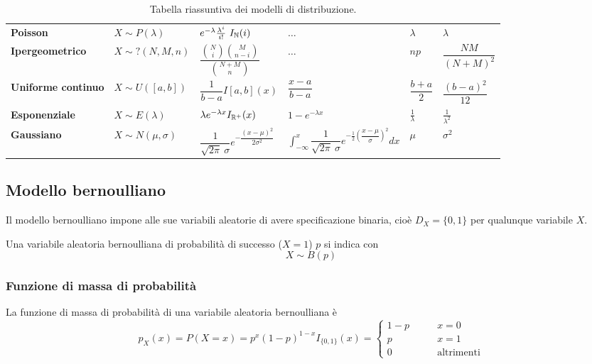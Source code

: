 \begin{sidewaystable}
\begin{tabular}{llllll}
		\bfseries Poisson           & $X\sim P(\lambda)$    & $e^{-\lambda}\frac{\lambda^i}{i!} ~ I_\mathbb N(i)$                     & $\dots$                                                                                                               & $\lambda$           & $\lambda$             \\[2ex]
		\bfseries Ipergeometrico    & $X\sim ?(N,M,n)$      & $\dfrac{\binom{N}{i}\binom{M}{n-i}}{\binom{N+M}{n}}$             & $\dots$                                                                                                               & $np$                & $\dfrac{NM}{(N+M)^2}$ \\[2ex]
		\bfseries Uniforme continuo & $X\sim U([a,b])$      & $\dfrac{1}{b-a} I[a,b](x)$                                       & $ \dfrac{x-a}{b-a}$                                                                                                   & $\dfrac{b+a}{2}$    & $\dfrac{(b-a)^2}{12}$ \\[3ex]
		\bfseries Esponenziale      & $X\sim E(\lambda)$    & $\lambda e^{-\lambda x} I_{\mathbb R^+}(x)$                             & $1-e^{-\lambda x}$                                                                                                    & $\frac{1}{\lambda}$ & $\frac{1}{\lambda^2}$ \\[1ex]
		\bfseries Gaussiano         & $X\sim N(\mu,\sigma)$ & $\dfrac{1}{\sqrt{2\pi}~\sigma}e^{-\dfrac{(x-\mu)^2}{2\sigma^2}}$ & $\displaystyle\int_{-\infty}^x \dfrac{1}{\sqrt{2\pi}~\sigma} e^{-\frac{1}{2}\left(\dfrac{x-\mu}{\sigma}\right)^2} dx$ & $\mu$               & $\sigma^2$            \\
		\bottomrule
	\end{tabular}
	\caption{Tabella riassuntiva dei modelli di distribuzione.}
\end{sidewaystable}

\subsection{Modello bernoulliano}
Il modello bernoulliano impone alle sue variabili aleatorie di avere specificazione binaria, cioè $D_X=\{0,1\}$ per qualunque variabile $X$.

Una variabile aleatoria bernoulliana di probabilità di successo ($X=1$) $p$ si indica con
\begin{equation*}
	X\sim B(p)
\end{equation*}


\subsubsection{Funzione di massa di probabilità}
La funzione di massa di probabilità di una variabile aleatoria bernoulliana è
\begin{equation*}
	p_X(x)=P(X=x)=p^x(1-p)^{1-x}I_{\{0,1\}}(x)=\begin{cases}
		1-p \qquad & x=0               \\
		p \qquad   & x=1               \\
		0 \qquad   & \text{altrimenti}
	\end{cases}
\end{equation*}


